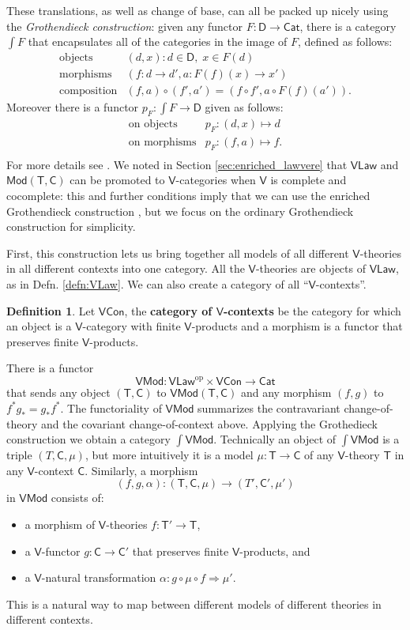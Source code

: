 \documentclass{amsart}
\theoremstyle{definition}
\newtheorem{definition}[theorem]{Definition}
\newcommand{\Cat}{\mathsf{Cat}}
\newcommand{\Law}{\mathsf{Law}}
\newcommand{\Mod}{\mathsf{Mod}}
\newcommand{\Con}{\mathsf{Con}}
\newcommand{\V}{\mathsf{V}}
\newcommand{\D}{\mathsf{D}}
\newcommand{\C}{\mathsf{C}}
\newcommand{\T}{\mathsf{T}}
\newcommand{\op}{\mathrm{op}}
\newcommand{\maps}{\colon}
\begin{document}
These translations, as well as change of base, can all be packed up nicely using the \textit{Grothendieck construction}: given any functor $F\maps \D \to \Cat$, there is a category $\int F$ that encapsulates all of the categories in the image of $F$, defined
as follows:
\[\begin{array}{rl}
\text{objects} & (d,x) \colon d\in \D, \; x\in F(d)\\
\text{morphisms} & (f\maps d\to d',a\maps F(f)(x)\to x')\\
\text{composition} & (f,a) \circ (f',a') = (f \circ f', a \circ F(f)(a')).
\end{array}\]
Moreover there is a functor $p_F \maps \int F \to \D$ given as follows:
\[\begin{array}{rl}
\text{on objects} & p_F \maps (d,x) \mapsto d \\
\text{on morphisms} & p_F \maps (f,a) \mapsto f .\\
\end{array}\]
For more details see \cite{borceux,jacobs}. We noted in Section \ref{sec:enriched_lawvere} that $\V\Law$ and $\Mod(\T,\C)$ can be promoted to $\V$-categories when $\V$ is complete and cocomplete: this and further conditions imply that we can use the enriched Grothendieck construction \cite{beardsleywong}, but we focus on the ordinary Grothendieck
construction for simplicity.   

First, this construction lets us bring together all models of all different $\V$-theories in all different contexts into one category.   All the $\V$-theories
are objects of $\V\Law$, as in Defn. \ref{defn:VLaw}.   We can also create a category of all  ``$\V$-contexts''.

\begin{definition} 
\label{defn:VCon}
Let $\V\Con$, the \textbf{category of $\V$-contexts} be the category for which an
object is a $\V$-category with finite $\V$-products and  a morphism is a functor that
preserves finite $\V$-products.   
\end{definition}

There is a functor 
\[    \V\Mod\maps \V\Law^\op \times \V\Con \to \Cat \]
that sends any object $(\T,\C)$ to $\V\Mod(\T,\C)$ and any morphism $(f,g)$ to
$f^* g_* = g_* f^*$.   The functoriality of $\V\Mod$ summarizes the 
contravariant change-of-theory and the covariant change-of-context above.
Applying the Grothedieck construction we obtain a category $\int \V\Mod$. 
Technically an object of $\int \V\Mod$ is a triple $(T,\C,\mu)$, but more intuitively 
it is a model $\mu \maps \T \to \C$ of any $\V$-theory $\T$ in any $\V$-context $\C$.   Similarly, a morphism 
\[   (f,g,\alpha)\maps (\T,\C,\mu) \to (T',\C',\mu') \]
in $\V\Mod$ consists of:
\begin{itemize}
\item
a morphism of $\V$-theories $f \maps \T' \to \T$,
\item
a $\V$-functor $g \maps\C\to \C'$ that preserves finite $\V$-products, and
\item 
a $\V$-natural transformation $\alpha\maps g \circ \mu \circ f \Rightarrow \mu'$.
\end{itemize}
This is a natural way to map between different models of different theories in different contexts.
\end{document}
